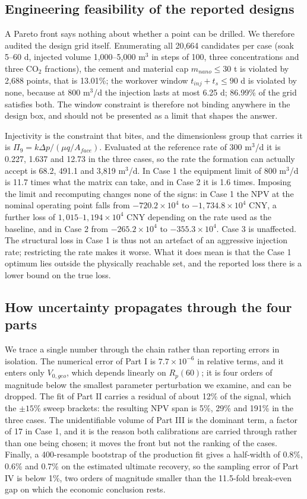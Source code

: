 \documentclass{swmcmthesis}
\begin{document}
\subsection{Engineering feasibility of the reported designs}
A Pareto front says nothing about whether a point can be drilled. We therefore audited the design grid itself. Enumerating all 20,664 candidates per case (soak 5--60 d, injected volume 1,000--5,000 m$^3$ in steps of 100, three concentrations and three CO$_2$ fractions), the cement and material cap $m_{nano}\le 30$ t is violated by 2,688 points, that is 13.01\%; the workover window $t_{inj}+t_s\le 90$ d is violated by none, because at 800 m$^3$/d the injection lasts at most 6.25 d; 86.99\% of the grid satisfies both. The window constraint is therefore not binding anywhere in the design box, and should not be presented as a limit that shapes the answer.

Injectivity is the constraint that bites, and the dimensionless group that carries it is $\Pi_9=k\Delta p/(\mu q/A_{face})$. Evaluated at the reference rate of 300 m$^3$/d it is 0.227, 1.637 and 12.73 in the three cases, so the rate the formation can actually accept is 68.2, 491.1 and 3,819 m$^3$/d. In Case 1 the equipment limit of 800 m$^3$/d is 11.7 times what the matrix can take, and in Case 2 it is 1.6 times. Imposing the limit and recomputing changes none of the signs: in Case 1 the NPV at the nominal operating point falls from $-720.2\times10^4$ to $-1,734.8\times10^4$ CNY, a further loss of $1,015$--$1,194\times10^4$ CNY depending on the rate used as the baseline, and in Case 2 from $-265.2\times10^4$ to $-355.3\times10^4$. Case 3 is unaffected. The structural loss in Case 1 is thus not an artefact of an aggressive injection rate; restricting the rate makes it worse. What it does mean is that the Case 1 optimum lies outside the physically reachable set, and the reported loss there is a lower bound on the true loss.

\subsection{How uncertainty propagates through the four parts}
We trace a single number through the chain rather than reporting errors in isolation. The numerical error of Part I is $7.7\times10^{-6}$ in relative terms, and it enters only $V_{0,geo}$, which depends linearly on $R_p(60)$; it is four orders of magnitude below the smallest parameter perturbation we examine, and can be dropped. The fit of Part II carries a residual of about 12\% of the signal, which the $\pm15\%$ sweep brackets: the resulting NPV span is 5\%, 29\% and 191\% in the three cases. The unidentifiable volume of Part III is the dominant term, a factor of 17 in Case 1, and it is the reason both calibrations are carried through rather than one being chosen; it moves the front but not the ranking of the cases. Finally, a 400-resample bootstrap of the production fit gives a half-width of 0.8\%, 0.6\% and 0.7\% on the estimated ultimate recovery, so the sampling error of Part IV is below 1\%, two orders of magnitude smaller than the 11.5-fold break-even gap on which the economic conclusion rests.
\end{document}
